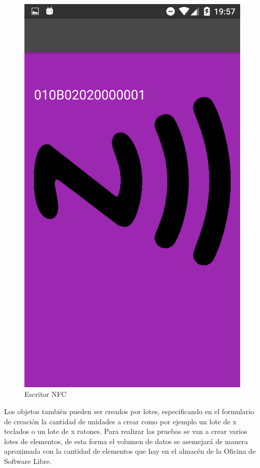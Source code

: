 \documentclass[a4paper,11pt]{book}
\begin{document}
\begin{figure}[H]
  \includegraphics[width=\linewidth]{imagenes/pruebas/movil/movil8.png}
  \caption{Escritor NFC\cite{propio}}
\endminipage\hfill
\end{figure}

Los objetos también pueden ser creados por lotes, especificando en el formulario de creación la cantidad de unidades a crear como por ejemplo un lote de x teclados o un lote de x ratones. Para realizar las pruebas se van a crear varios lotes de elementos, de esta forma el volumen de datos se asemejará de manera aproximada con la cantidad de elementos que hay en el almacén de la Oficina de Software Libre. 
\end{document}
